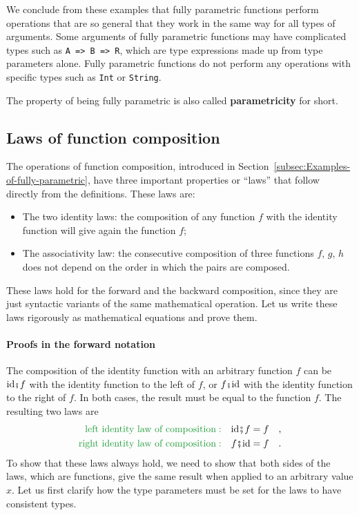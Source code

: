 We conclude from these examples that fully parametric functions perform
operations that are so general that they work in the same way for
all types of arguments. Some arguments of fully parametric functions
may have complicated types such as \lstinline!A => B => R!, which
are type expressions made up from type parameters alone. Fully parametric
functions do not perform any operations with specific types such as
\lstinline!Int! or \lstinline!String!.

The property of being fully parametric is also called \textbf{parametricity}
for short.

\subsection{Laws of function composition\label{subsec:Laws-of-function-composition}}

The operations of function composition, introduced in Section~\ref{subsec:Examples-of-fully-parametric},
have three important properties or ``laws'' that follow directly
from the definitions. These laws are:
\begin{itemize}
\item The two identity laws: the composition of any function $f$ with the
identity function will give again the function $f$;
\item The associativity law: the consecutive composition of three functions
$f$, $g$, $h$ does not depend on the order in which the pairs are
composed.
\end{itemize}
These laws hold for the forward and the backward composition, since
they are just syntactic variants of the same mathematical operation.
Let us write these laws rigorously as mathematical equations and prove
them.

\paragraph{Proofs in the forward notation}

The composition of the identity function with an arbitrary function
$f$ can be $\text{id}\bef f$ with the identity function to the left
of $f$, or $f\bef\text{id}$ with the identity function to the right
of $f$. In both cases, the result must be equal to the function $f$.
The resulting two laws are
\begin{align*}
{\color{greenunder}\text{left identity law of composition}:}\quad & \text{id}\bef f=f\quad,\\
{\color{greenunder}\text{right identity law of composition}:}\quad & f\bef\text{id}=f\quad.
\end{align*}
To show that these laws always hold, we need to show that both sides
of the laws, which are functions, give the same result when applied
to an arbitrary value $x$. Let us first clarify how the type parameters
must be set for the laws to have consistent types.

